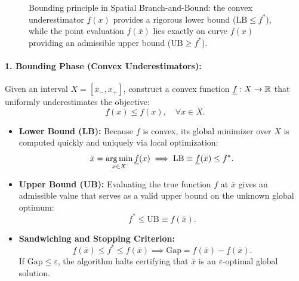 \begin{figure}[htbp]
\caption{Bounding principle in Spatial Branch-and-Bound: the convex underestimator $\underline{f}(x)$ provides a rigorous lower bound ($\text{LB} \le f^*$), while the point evaluation $f(\bar{x})$ lies exactly on curve $f(x)$ providing an admissible upper bound ($\text{UB} \ge f^*$).}
\label{fig:spatial-branch-and-bound-bounding-en}
\end{figure}

\paragraph{1. Bounding Phase (Convex Underestimators):}
Given an interval $X = [x_-, x_+]$, construct a convex function $\underline{f}: X \to \mathbb{R}$ that uniformly underestimates the objective:
\begin{equation}
    \underline{f}(x) \le f(x), \quad \forall x \in X.
\end{equation}
\begin{itemize}
    \item \textbf{Lower Bound (LB):} Because $\underline{f}$ is convex, its global minimizer over $X$ is computed quickly and uniquely via local optimization:
    \begin{equation}
        \bar{x} = \operatorname*{arg\,min}_{x \in X} \underline{f}(x) \implies \text{LB} \equiv \underline{f}(\bar{x}) \le f^*.
    \end{equation}
    \item \textbf{Upper Bound (UB):} Evaluating the true function $f$ at $\bar{x}$ gives an admissible value that serves as a valid upper bound on the unknown global optimum:
    \begin{equation}
        f^* \le \text{UB} \equiv f(\bar{x}).
    \end{equation}
    \item \textbf{Sandwiching and Stopping Criterion:}
    \begin{equation}
        \underline{f}(\bar{x}) \le f^* \le f(\bar{x}) \implies \text{Gap} = f(\bar{x}) - \underline{f}(\bar{x}).
    \end{equation}
    If $\text{Gap} \le \varepsilon$, the algorithm halts certifying that $\bar{x}$ is an $\varepsilon$-optimal global solution.
\end{itemize}


